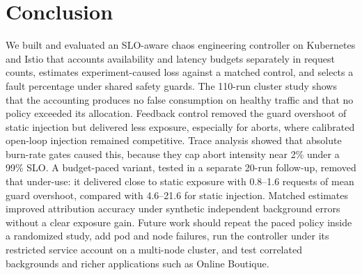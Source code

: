 \documentclass[a4paper,fleqn,11pt]{cas-dc}
\begin{document}
\section{Conclusion}\label{sec:conclusion}
We built and evaluated an SLO-aware chaos engineering controller on Kubernetes and Istio that accounts availability and latency budgets separately in request counts, estimates experiment-caused loss against a matched control, and selects a fault percentage under shared safety guards. The 110-run cluster study shows that the accounting produces no false consumption on healthy traffic and that no policy exceeded its allocation. Feedback control removed the guard overshoot of static injection but delivered less exposure, especially for aborts, where calibrated open-loop injection remained competitive. Trace analysis showed that absolute burn-rate gates caused this, because they cap abort intensity near 2\% under a 99\% SLO. A budget-paced variant, tested in a separate 20-run follow-up, removed that under-use: it delivered close to static exposure with 0.8--1.6 requests of mean guard overshoot, compared with 4.6--21.6 for static injection. Matched estimates improved attribution accuracy under synthetic independent background errors without a clear exposure gain. Future work should repeat the paced policy inside a randomized study, add pod and node failures, run the controller under its restricted service account on a multi-node cluster, and test correlated backgrounds and richer applications such as Online Boutique.

%


\end{document}
